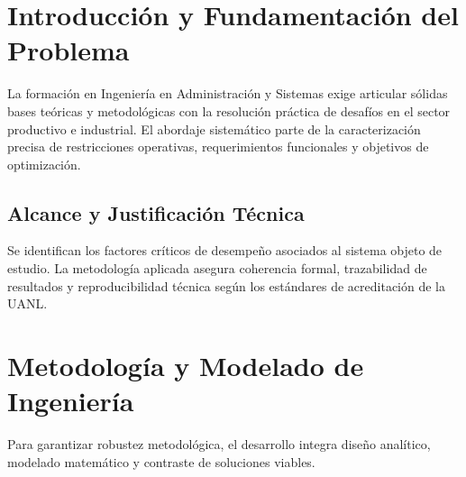 \documentclass[
	spanish,
	letterpaper,
	oneside
]{article}
\begin{document}
\templatePortrait

\begin{abstract}
El presente informe documenta el desarrollo riguroso de la evidencia de aprendizaje correspondiente al programa educativo de Ingeniería en Administración y Sistemas en la Facultad de Ingeniería Mecánica y Eléctrica de la Universidad Autónoma de Nuevo León. Conforme a las directrices de calidad de AulaTeX, el trabajo aborda la formulación del problema técnico, el modelado y análisis riguroso de variables, la comprobación experimental o analítica y la transferencia directa al campo profesional, excluyendo cualquier residuo de metadatos operativos o plataformas de gestión.
\end{abstract}

\newpage


\section{Introducción y Fundamentación del Problema}
La formación en Ingeniería en Administración y Sistemas exige articular sólidas bases teóricas y metodológicas con la resolución práctica de desafíos en el sector productivo e industrial. El abordaje sistemático parte de la caracterización precisa de restricciones operativas, requerimientos funcionales y objetivos de optimización.

\subsection{Alcance y Justificación Técnica}
Se identifican los factores críticos de desempeño asociados al sistema objeto de estudio. La metodología aplicada asegura coherencia formal, trazabilidad de resultados y reproducibilidad técnica según los estándares de acreditación de la UANL.

\section{Metodología y Modelado de Ingeniería}
Para garantizar robustez metodológica, el desarrollo integra diseño analítico, modelado matemático y contraste de soluciones viables.
\end{document}
